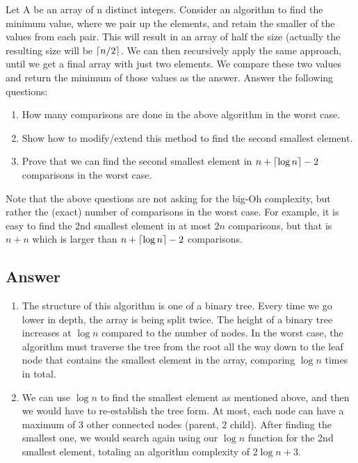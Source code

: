 \documentclass[
	12pt
]{fphw}
\DeclarePairedDelimiter\ceil{\lceil}{\rceil}
\begin{document}
\begin{problem}
	Let A be an array of n distinct integers. Consider an algorithm to find the minimum value, where we pair up the elements, and retain the smaller of the values from each pair. This will result in an array of half the size (actually the resulting size will be $\ceil*{n/2}$. We can then recursively apply the same approach, until we get a final array with just two elements. We compare these two values and return the minimum of those values as the answer. Answer the following questions:
	
	
	
	
	\medskip
	
	\begin{enumerate}
		\item How many comparisons are done in the above algorithm in the worst case.
		\item Show how to modify/extend this method to find the second smallest element.
		\item Prove that we can find the second smallest element in $n + \ceil*{\log n} - 2$ comparisons in the worst case.
	\end{enumerate}

	Note that the above questions are not asking for the big-Oh complexity, but rather the (exact) number of comparisons in the worst case. For example, it is easy to find the 2nd smallest element in at most $2n$ comparisons, but that is $n + n$ which is larger than $n + \ceil*{\log n} - 2$ comparisons.
\end{problem}


\subsection*{Answer} 

\begin{enumerate}
	\item The structure of this algorithm is one of a binary tree. Every time we go lower in depth, the array is being split twice. The height of a binary tree increases at $\log n$ compared to the number of nodes. In the worst case, the algorithm must traverse the tree from the root all the way down to the leaf node that contains the smallest element in the array, comparing $\boxed{\log n}$ times in total.
	\item We can use $\log n$ to find the smallest element as mentioned above, and then we would have to re-establish the tree form. At most, each node can have a maximum of $3$ other connected nodes (parent, 2 child). After finding the smallest one, we would search again using our $\log n$ function for the 2nd smallest element, totaling an algorithm complexity of $\boxed{2\log n + 3}$. 
\end{enumerate}

\end{document}
